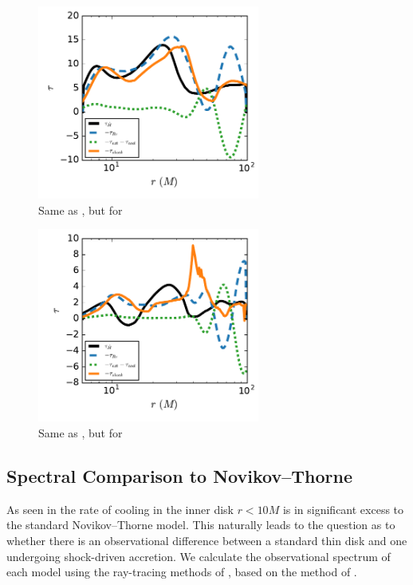\begin{figure}
\begin{center}
	\includegraphics[width=0.65\textwidth]{figures/minidisk/q011_m3_torque_r.pdf}
\end{center}
	\caption{ Same as , but for }  
\end{figure}

\begin{figure}
	\begin{center}
	\includegraphics[width=0.65\textwidth]{figures/minidisk/q011_m4_torque_r.pdf}
	\end{center}
	\caption{ Same as , but for }  
\end{figure}

\subsection{Spectral Comparison to Novikov--Thorne}

As seen in  the rate of cooling in the inner disk $r < 10M$ is in significant excess to the standard Novikov--Thorne model.  This naturally leads to the question as to whether there is an observational difference between a standard thin disk and one undergoing shock-driven accretion.  We calculate the observational spectrum of each model using the ray-tracing methods of , based on the method of \cite{Kulkarni11}.

